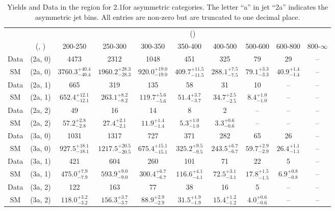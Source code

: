 \begin{table}[h!]
\tiny
\centering
\caption{Yields and Data in the \mj region for 2.1\ifb for asymmetric categories. The letter ``a'' in jet \eg ``2a''  indicates the asymmetric jet bins. All entries are non-zero but are truncated to one decimal place.\label{tab:yieldsall_mu_comb_asym}}
\begin{tabular}
{cccccccccc}
	\hline\hline
	&	& \multicolumn{8}{c}{\scalht (\gev)}\\ 
	&	 (\njet, \nb) & 200-250 & 250-300 & 300-350 & 350-400 & 400-500 & 500-600 & 600-800 & 800-$\infty$ \\ [0.8ex] 
\hline
	Data & (2a, 0) & 4473 & 2312 & 1048 & 451 & 325 & 79 & 29 & -- \\[0.5ex] 
	SM & (2a, 0) & $3760.3^{+ 40.4 }_{- 40.4 }$ & $1960.2^{+ 28.3 }_{- 28.3 }$ & $920.0^{+ 19.0 }_{- 19.0 }$ & $409.7^{+ 11.5 }_{- 11.5 }$ & $288.1^{+ 7.5 }_{- 7.5 }$ & $79.1^{+ 3.3 }_{- 3.3 }$ & $40.9^{+ 1.4 }_{- 1.4 }$ & -- \\[0.5ex] 
	Data & (2a, 1) & 665 & 319 & 135 & 58 & 31 & 10 & -- & -- \\[0.5ex] 
	SM & (2a, 1) & $652.4^{+ 12.1 }_{- 12.1 }$ & $263.1^{+ 8.2 }_{- 8.2 }$ & $119.7^{+ 5.6 }_{- 5.6 }$ & $51.4^{+ 3.7 }_{- 3.7 }$ & $34.7^{+ 2.5 }_{- 2.5 }$ & $8.4^{+ 1.0 }_{- 1.0 }$ & -- & -- \\[0.5ex] 
	Data & (2a, 2) & 49 & 16 & 14 & 8 & 2 & -- & -- & -- \\[0.5ex] 
	SM & (2a, 2) & $57.2^{+ 2.8 }_{- 2.8 }$ & $27.4^{+ 2.1 }_{- 2.1 }$ & $11.9^{+ 1.4 }_{- 1.4 }$ & $5.3^{+ 1.0 }_{- 1.0 }$ & $3.3^{+ 0.6 }_{- 0.6 }$ & -- & -- & -- \\[0.5ex] 
	Data & (3a, 0) & 1031 & 1317 & 727 & 371 & 282 & 65 & 26 & -- \\[0.5ex] 
	SM & (3a, 0) & $927.5^{+ 18.1 }_{- 18.1 }$ & $1217.5^{+ 20.5 }_{- 20.5 }$ & $675.4^{+ 15.1 }_{- 15.1 }$ & $325.2^{+ 9.5 }_{- 9.5 }$ & $243.5^{+ 6.7 }_{- 6.7 }$ & $59.7^{+ 2.9 }_{- 2.9 }$ & $26.4^{+ 1.1 }_{- 1.1 }$ & -- \\[0.5ex] 
	Data & (3a, 1) & 421 & 604 & 260 & 101 & 71 & 22 & 5 & -- \\[0.5ex] 
	SM & (3a, 1) & $475.0^{+ 7.9 }_{- 7.9 }$ & $593.9^{+ 9.0 }_{- 9.0 }$ & $300.4^{+ 6.7 }_{- 6.7 }$ & $116.6^{+ 4.1 }_{- 4.1 }$ & $72.5^{+ 3.1 }_{- 3.1 }$ & $17.8^{+ 1.5 }_{- 1.5 }$ & $6.9^{+ 0.8 }_{- 0.8 }$ & -- \\[0.5ex] 
	Data & (3a, 2) & 122 & 163 & 77 & 38 & 16 & 5 & -- & -- \\[0.5ex] 
	SM & (3a, 2) & $118.0^{+ 3.2 }_{- 3.2 }$ & $156.3^{+ 3.7 }_{- 3.7 }$ & $88.9^{+ 2.9 }_{- 2.9 }$ & $31.5^{+ 1.9 }_{- 1.9 }$ & $15.4^{+ 1.2 }_{- 1.2 }$ & $4.0^{+ 0.6 }_{- 0.6 }$ & -- & -- \\[0.5ex] 

\end{tabular}
\end{table}
